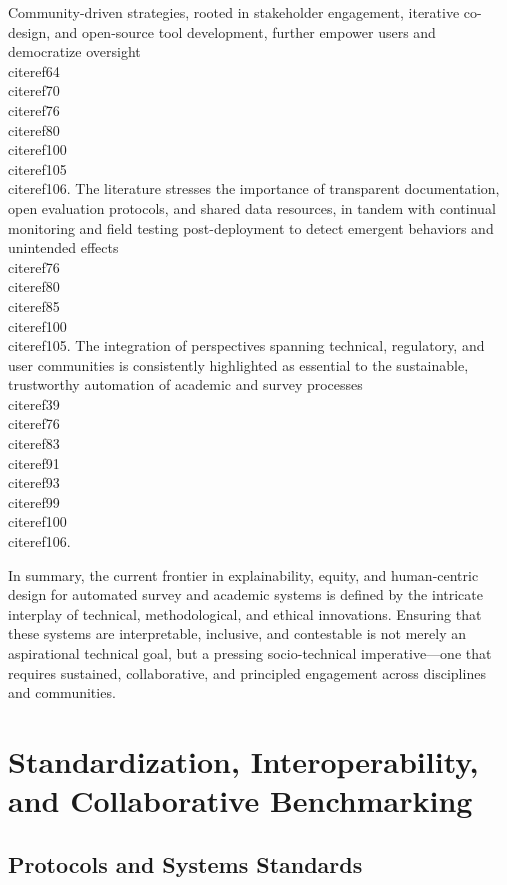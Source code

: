 \documentclass[11pt]{article}
\begin{document}
Community-driven strategies, rooted in stakeholder engagement, iterative co-design, and open-source tool development, further empower users and democratize oversight \\cite{ref64}\\cite{ref70}\\cite{ref76}\\cite{ref80}\\cite{ref100}\\cite{ref105}\\cite{ref106}. The literature stresses the importance of transparent documentation, open evaluation protocols, and shared data resources, in tandem with continual monitoring and field testing post-deployment to detect emergent behaviors and unintended effects \\cite{ref76}\\cite{ref80}\\cite{ref85}\\cite{ref100}\\cite{ref105}. The integration of perspectives spanning technical, regulatory, and user communities is consistently highlighted as essential to the sustainable, trustworthy automation of academic and survey processes \\cite{ref39}\\cite{ref76}\\cite{ref83}\\cite{ref91}\\cite{ref93}\\cite{ref99}\\cite{ref100}\\cite{ref106}.

In summary, the current frontier in explainability, equity, and human-centric design for automated survey and academic systems is defined by the intricate interplay of technical, methodological, and ethical innovations. Ensuring that these systems are interpretable, inclusive, and contestable is not merely an aspirational technical goal, but a pressing socio-technical imperative—one that requires sustained, collaborative, and principled engagement across disciplines and communities.

\section{Standardization, Interoperability, and Collaborative Benchmarking}

\subsection{Protocols and Systems Standards}
\end{document}
